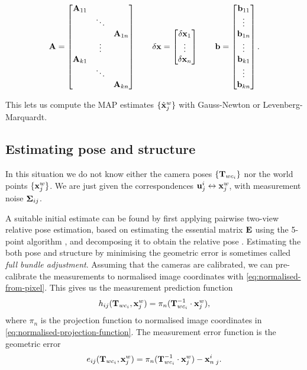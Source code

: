 \begin{equation}
  {\boldsymbol{\mathbf{A}}} =  
  \begin{bmatrix}
    {\boldsymbol{\mathbf{A}}}_{11} & & \\
    & \ddots & \\
    & & {\boldsymbol{\mathbf{A}}}_{1n}\\
    & \vdots &\\
    {\boldsymbol{\mathbf{A}}}_{k1} & & \\
    & \ddots & \\
    & & {\boldsymbol{\mathbf{A}}}_{kn}
  \end{bmatrix}
  \qquad  
  \delta{\boldsymbol{\mathbf{x}}} =
  \begin{bmatrix}
    \delta{\boldsymbol{\mathbf{x}}}_1\\
    \vdots\\
    \delta{\boldsymbol{\mathbf{x}}}_n
  \end{bmatrix}
  \qquad
  {\boldsymbol{\mathbf{b}}} =  
  \begin{bmatrix}
    {\boldsymbol{\mathbf{b}}}_{11}\\
    \vdots\\
    {\boldsymbol{\mathbf{b}}}_{1n}\\
    \vdots\\
    {\boldsymbol{\mathbf{b}}}_{k1}\\
    \vdots\\
    {\boldsymbol{\mathbf{b}}}_{kn}
  \end{bmatrix}.
\end{equation}

This lets us compute the MAP estimates $\{\hat{{\boldsymbol{\mathbf{x}}}}^w_j\}$ with Gauss-Newton or Levenberg-Marquardt.


\subsection{Estimating pose and structure}
In this situation we do not know either the camera poses $\{ {\boldsymbol{\mathbf{T}}}_{wc_i}\}$ nor the world points $\{ {\boldsymbol{\mathbf{x}}}^w_j \}$.
We are just given the correspondences ${\boldsymbol{\mathbf{u}}}^i_j \leftrightarrow {\boldsymbol{\mathbf{x}}}^w_j$, with measurement noise ${\boldsymbol{\mathbf{\Sigma}}}_{ij}$.

A suitable initial estimate can be found by first applying pairwise two-view relative pose estimation, based on estimating the essential matrix ${\boldsymbol{\mathbf{E}}}$ using the 5-point algorithm \cite{Nister2004AnProblem}, and decomposing it to obtain the relative pose \cite{Hartley2004MultipleVision}.
Estimating the both pose and structure by minimising the geometric error is sometimes called \emph{full bundle adjustment}.
Assuming that the cameras are calibrated, we can pre-calibrate the measurements to normalised image coordinates with \eqref{eq:normalised-from-pixel}.
This gives us the measurement prediction function
\begin{equation}
  h_{ij}({\boldsymbol{\mathbf{T}}}_{wc_i}, {\boldsymbol{\mathbf{x}}}^w_j) = \pi_n({\boldsymbol{\mathbf{T}}}_{wc_i}^{-1} \cdot {\boldsymbol{\mathbf{x}}}^w_j),
\end{equation}
where $\pi_n$ is the projection function to normalised image coordinates in \eqref{eq:normalised-projection-function}.
The measurement error function is the geometric error
\begin{equation}
  e_{ij}({\boldsymbol{\mathbf{T}}}_{wc_i}, {\boldsymbol{\mathbf{x}}}^w_j) = \pi_n({\boldsymbol{\mathbf{T}}}_{wc_i}^{-1} \cdot {\boldsymbol{\mathbf{x}}}^w_j) - {\boldsymbol{\mathbf{x}}}_{n \; j}^i.
\end{equation}

